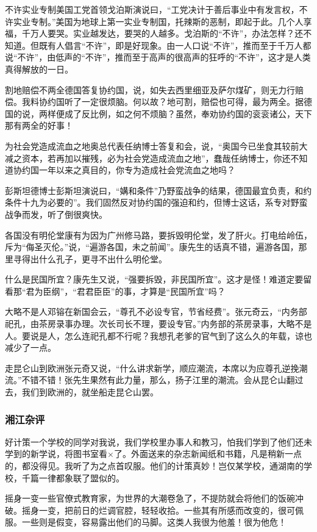 不许实业专制美国工党首领戈泊斯演说曰，“工党决计于善后事业中有发言权，不许实业专制。”美国为地球上第一实业专制国，托辣斯的恶制，即起于此。几个人享福，千万人要哭。实业越发达，要哭的人越多。戈泊斯的“不许”，办法怎样？还不知道。但既有人倡言“不许”，即是好现象。由一人口说“不许”，推而至于千万人都说“不许”，由低声的“不许”，推而至于高声的很高声的狂呼的“不许”，这才是人类真得解放的一日。

割地赔偿不两全德国答复协约国，说，如失去西里细亚及萨尔煤矿，则无力行赔偿。我料协约国听了一定很烦脑。何以故？地可割，赔偿也可得，最为两全。据德国的说，两样便成了反比例，如之何不烦脑？虽然，奉劝协约国的衮衮诸公，天下那有两全的好事！

为社会党造成流血之地奥总代表任纳博士答复和会，说，“奥国今已坐食其较前大减之资本，若再加以摧残，必为社会党造成流血之地”，蠢哉任纳博士，你还不知道协约国一年以来之真目的，你专为造成社会党流血之地吗？

彭斯坦德博士彭斯坦演说曰，“媾和条件”乃野蛮战争的结果，德国最宜负责，和约条件十九为必要的”。我们固然反对协约国的强迫和约，但博士这话，系专对野蛮战争而发，听了倒很爽快。

各国没有明伦堂康有为因为广州修马路，要拆毁明伦堂，发了肝火。打电给岭伍，斥为“侮圣灭伦。”说，“遍游各国，未之前闻”。康先生的话真不错，遍游各国，那里寻得出什么孔子，更寻不出什么明伦堂。

什么是民国所宜？康先生又说，“强要拆毁，非民国所宜”。这才是怪！难道定要留看那“君为臣纲”，“君君臣臣”的事，才算是“民国所宜”吗？

大略不是人邓镕在新国会云，“尊孔不必设专官，节省经费”。张元奇云，“内务部祀孔，由茶房录事办理。次长司长不理，要设专官。”内务部的茶房录事，大略不是人。要说是人，怎么连祀孔都不行呢？我想孔老爹的官气到了这么久的年载，谅也减少了一点。

走昆仑山到欧洲张元奇又说，“什么讲求新学，顺应潮流，本席以为应尊孔逆挽潮流。”不错不错！张先生果然有此力量，那么，扬子江里的潮流。会从昆仑山翻过去，我们到欧洲的，就坐船走昆仑山罢。

\subsubsection{湘江杂评}

好计策一个学校的同学对我说，我们学校里办事人和教习，怕我们学到了他们还未学到的新学说，将图书室看×了。外面送来的杂志新闻纸和书籍，凡是稍新一点的，都没得见。我听了为之点首叹服。他们的计策真妙！岂仅某学校，通湖南的学校，千篇一律都象联了盟似的。

摇身一变一些官僚式教育家，为世界的大潮卷急了，不提防就会将他们的饭碗冲破。摇身一变，把前日的烂调官腔，轻轻收拾。一些其有所感而改变的，很可佩服。一些则是假变，容易露出他们的马脚。这类人我很为他羞！很为他危！

